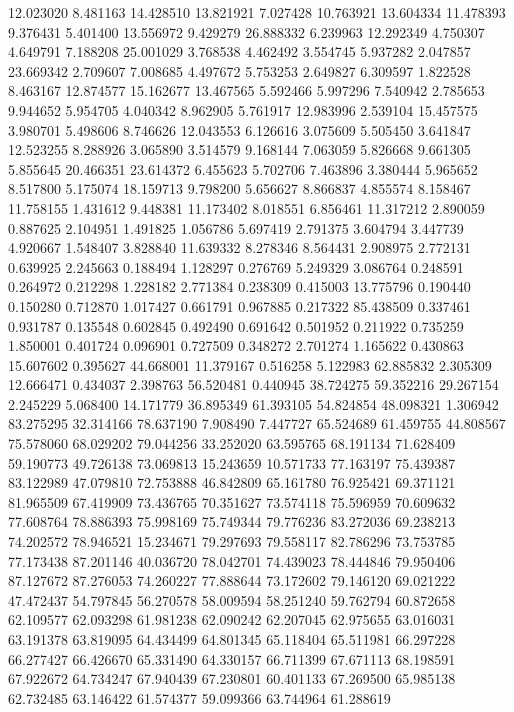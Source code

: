 12.023020
8.481163
14.428510
13.821921
7.027428
10.763921
13.604334
11.478393
9.376431
5.401400
13.556972
9.429279
26.888332
6.239963
12.292349
4.750307
4.649791
7.188208
25.001029
3.768538
4.462492
3.554745
5.937282
2.047857
23.669342
2.709607
7.008685
4.497672
5.753253
2.649827
6.309597
1.822528
8.463167
12.874577
15.162677
13.467565
5.592466
5.997296
7.540942
2.785653
9.944652
5.954705
4.040342
8.962905
5.761917
12.983996
2.539104
15.457575
3.980701
5.498606
8.746626
12.043553
6.126616
3.075609
5.505450
3.641847
12.523255
8.288926
3.065890
3.514579
9.168144
7.063059
5.826668
9.661305
5.855645
20.466351
23.614372
6.455623
5.702706
7.463896
3.380444
5.965652
8.517800
5.175074
18.159713
9.798200
5.656627
8.866837
4.855574
8.158467
11.758155
1.431612
9.448381
11.173402
8.018551
6.856461
11.317212
2.890059
0.887625
2.104951
1.491825
1.056786
5.697419
2.791375
3.604794
3.447739
4.920667
1.548407
3.828840
11.639332
8.278346
8.564431
2.908975
2.772131
0.639925
2.245663
0.188494
1.128297
0.276769
5.249329
3.086764
0.248591
0.264972
0.212298
1.228182
2.771384
0.238309
0.415003
13.775796
0.190440
0.150280
0.712870
1.017427
0.661791
0.967885
0.217322
85.438509
0.337461
0.931787
0.135548
0.602845
0.492490
0.691642
0.501952
0.211922
0.735259
1.850001
0.401724
0.096901
0.727509
0.348272
2.701274
1.165622
0.430863
15.607602
0.395627
44.668001
11.379167
0.516258
5.122983
62.885832
2.305309
12.666471
0.434037
2.398763
56.520481
0.440945
38.724275
59.352216
29.267154
2.245229
5.068400
14.171779
36.895349
61.393105
54.824854
48.098321
1.306942
83.275295
32.314166
78.637190
7.908490
7.447727
65.524689
61.459755
44.808567
75.578060
68.029202
79.044256
33.252020
63.595765
68.191134
71.628409
59.190773
49.726138
73.069813
15.243659
10.571733
77.163197
75.439387
83.122989
47.079810
72.753888
46.842809
65.161780
76.925421
69.371121
81.965509
67.419909
73.436765
70.351627
73.574118
75.596959
70.609632
77.608764
78.886393
75.998169
75.749344
79.776236
83.272036
69.238213
74.202572
78.946521
15.234671
79.297693
79.558117
82.786296
73.753785
77.173438
87.201146
40.036720
78.042701
74.439023
78.444846
79.950406
87.127672
87.276053
74.260227
77.888644
73.172602
79.146120
69.021222
47.472437
54.797845
56.270578
58.009594
58.251240
59.762794
60.872658
62.109577
62.093298
61.981238
62.090242
62.207045
62.975655
63.016031
63.191378
63.819095
64.434499
64.801345
65.118404
65.511981
66.297228
66.277427
66.426670
65.331490
64.330157
66.711399
67.671113
68.198591
67.922672
64.734247
67.940439
67.230801
60.401133
67.269500
65.985138
62.732485
63.146422
61.574377
59.099366
63.744964
61.288619
